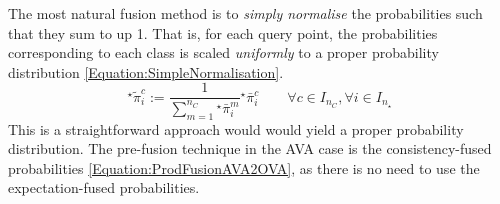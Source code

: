 					
					The most natural fusion method is to \textit{simply normalise} the probabilities such that they sum to up 1. That is, for each query point, the probabilities corresponding to each class is scaled \textit{uniformly} to a proper probability distribution \eqref{Equation:SimpleNormalisation}. \begin{equation}
						{^{\star}}\tilde{\pi}^{c}_{i} := \frac{1}{\sum_{m = 1}^{n_{C}} {^{\star}}\bar{\pi}^{m}_{i}} {^{\star}}\bar{\pi}^{c}_{i} \qquad \forall c \in I_{n_{C}}, \forall i \in I_{n_{\star}}
					\label{Equation:SimpleNormalisation}
					\end{equation} This is a straightforward approach would would yield a proper probability distribution. The pre-fusion technique in the AVA case is the consistency-fused probabilities \eqref{Equation:ProdFusionAVA2OVA}, as there is no need to use the expectation-fused probabilities.
					
					

